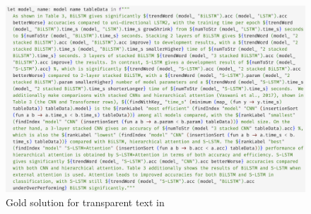 \begin{figure}[h]
    \small
    \includegraphics[scale=0.169]{fig/scigen-1805.02474v1-10-src-screenshot.png}
    \caption{Gold solution for transparent text in }
    \label{fig:fluid-example-paragraph}
\end{figure}

